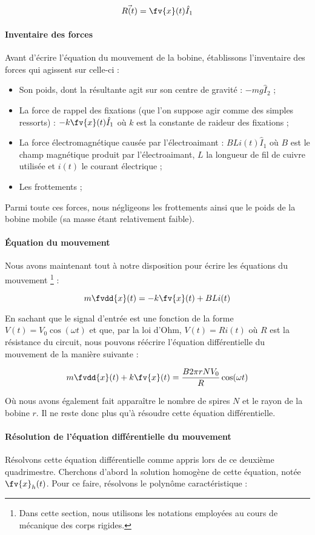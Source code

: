 $$\vec{R(t)} = \fv{x}(t) \hat{I}_1$$

\paragraph{Inventaire des forces}
Avant d'écrire l'équation du mouvement de la bobine, établissons l'inventaire
des forces qui agissent sur celle-ci :

\begin{itemize}
\item Son poids, dont la résultante agit sur son centre de gravité : $-mg\hat{I}_2$ ;
\item La force de rappel des fixations (que l'on suppose agir comme des simples
ressorts) : $-k \fv{x}(t) \hat{I}_1$ où $k$ est la constante de raideur des fixations ;
\item La force électromagnétique causée par l'électroaimant : $BLi(t) \hat{I}_1$ où
$B$ est le champ magnétique produit par l'électroaimant, $L$ la longueur de fil de cuivre
utilisée et $i(t)$ le courant électrique ;
\item Les frottements ;
\end{itemize}
Parmi toute ces forces, nous négligeons les frottements ainsi que le poids
de la bobine mobile (sa masse étant relativement faible).
\paragraph{Équation du mouvement}
Nous avons maintenant tout à notre disposition pour écrire les équations du mouvement
\footnote{Dans cette section, nous utilisons les notations employées au cours de
mécanique des corps rigides.} :

$$m\fvdd{x}(t) = -k\fv{x}(t) + BLi(t)$$

En sachant que le signal d'entrée est une fonction de la forme $V(t) = V_0 \cos (\omega t)$ et
que, par la loi d'Ohm, $V(t) = Ri(t)$ où $R$ est la résistance du circuit,
nous pouvons réécrire l'équation différentielle du mouvement de la manière suivante :

$$m\fvdd{x}(t) + k\fv{x}(t) = \frac{B2\pi rNV_0}{R}\cos (\omega t)$$

Où nous avons également fait apparaître le nombre de spires $N$ et le rayon de la bobine
$r$. Il ne reste donc plus qu'à résoudre cette équation différentielle.

\paragraph{Résolution de l'équation différentielle du mouvement}
Résolvons cette équation différentielle comme appris lors de ce deuxième
quadrimestre. Cherchons d'abord la solution homogène de cette équation, notée $\fv{x}_h(t)$.
Pour ce faire, résolvons le polynôme caractéristique :

